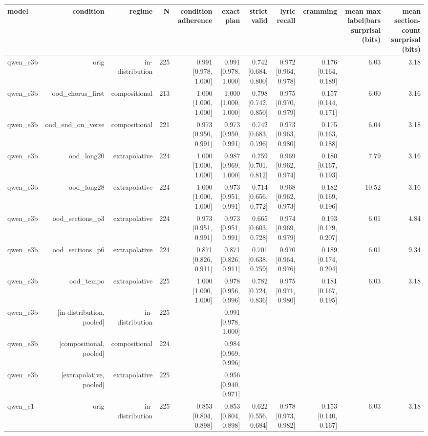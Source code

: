 \begin{table}[t]
\centering
\small
\begin{tabular}{lrrrrrrrrrr}
\toprule
model & condition & regime & N & condition adherence & exact plan & strict valid & lyric recall & cramming & mean max label|bars surprisal (bits) & mean section-count surprisal (bits) \\
\midrule
qwen\_e3b & orig & in-distribution & 225 & 0.991 [0.978, 1.000] & 0.991 [0.978, 1.000] & 0.742 [0.684, 0.800] & 0.972 [0.964, 0.978] & 0.176 [0.164, 0.189] & 6.03 & 3.18 \\
qwen\_e3b & ood\_chorus\_first & compositional & 213 & 1.000 [1.000, 1.000] & 1.000 [1.000, 1.000] & 0.798 [0.742, 0.850] & 0.975 [0.970, 0.979] & 0.157 [0.144, 0.171] & 6.00 & 3.16 \\
qwen\_e3b & ood\_end\_on\_verse & compositional & 221 & 0.973 [0.950, 0.991] & 0.973 [0.950, 0.991] & 0.742 [0.683, 0.796] & 0.973 [0.963, 0.980] & 0.175 [0.163, 0.188] & 6.04 & 3.18 \\
qwen\_e3b & ood\_long20 & extrapolative & 224 & 1.000 [1.000, 1.000] & 0.987 [0.969, 1.000] & 0.759 [0.701, 0.812] & 0.969 [0.962, 0.974] & 0.180 [0.167, 0.193] & 7.79 & 3.16 \\
qwen\_e3b & ood\_long28 & extrapolative & 224 & 1.000 [1.000, 1.000] & 0.973 [0.951, 0.991] & 0.714 [0.656, 0.772] & 0.968 [0.962, 0.973] & 0.182 [0.169, 0.196] & 10.52 & 3.16 \\
qwen\_e3b & ood\_sections\_p3 & extrapolative & 224 & 0.973 [0.951, 0.991] & 0.973 [0.951, 0.991] & 0.665 [0.603, 0.728] & 0.974 [0.969, 0.979] & 0.193 [0.179, 0.207] & 6.01 & 4.84 \\
qwen\_e3b & ood\_sections\_p6 & extrapolative & 224 & 0.871 [0.826, 0.911] & 0.871 [0.826, 0.911] & 0.701 [0.638, 0.759] & 0.970 [0.964, 0.976] & 0.189 [0.174, 0.204] & 6.01 & 9.34 \\
qwen\_e3b & ood\_tempo & extrapolative & 225 & 1.000 [1.000, 1.000] & 0.978 [0.956, 0.996] & 0.782 [0.724, 0.836] & 0.975 [0.971, 0.980] & 0.181 [0.167, 0.195] & 6.03 & 3.18 \\
qwen\_e3b & [in-distribution, pooled] & in-distribution & 225 &  & 0.991 [0.978, 1.000] &  &  &  &  &  \\
qwen\_e3b & [compositional, pooled] & compositional & 224 &  & 0.984 [0.969, 0.996] &  &  &  &  &  \\
qwen\_e3b & [extrapolative, pooled] & extrapolative & 225 &  & 0.956 [0.940, 0.971] &  &  &  &  &  \\
qwen\_e1 & orig & in-distribution & 225 & 0.853 [0.804, 0.898] & 0.853 [0.804, 0.898] & 0.622 [0.556, 0.684] & 0.978 [0.973, 0.982] & 0.153 [0.140, 0.167] & 6.03 & 3.18 \\

\end{tabular}
\end{table}
